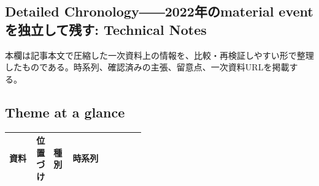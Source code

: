 \subsection*{Detailed Chronology――2022年のmaterial eventを独立して残す: Technical Notes}
本欄は記事本文で圧縮した一次資料上の情報を、比較・再検証しやすい形で整理したものである。時系列、確認済みの主張、留意点、一次資料URLを掲載する。
\medskip
\subsection*{Theme at a glance}
\begin{center}
\footnotesize
\begin{tabularx}{\linewidth}{@{}p{0.20\linewidth}p{0.10\linewidth}p{0.14\linewidth}X@{}}
\toprule
資料 & 位置づけ & 種別 & 時系列 \\
\midrule
\bottomrule
\end{tabularx}
\end{center}
\normalsize

